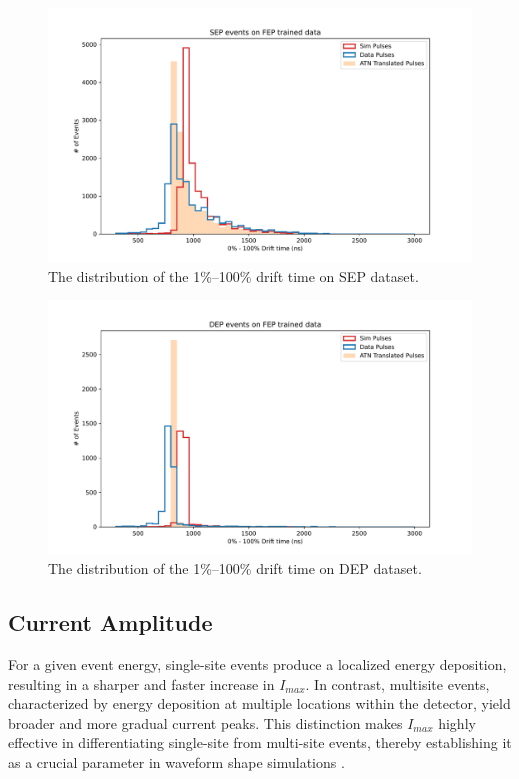 \begin{figure}%
\centering
\includegraphics[width=0.9\linewidth,trim={0pc 0pc 0pc 0pc},clip]{ch8/figs/sep_drift_time.pdf}
\caption{The distribution of the 1\%–100\% drift time on SEP dataset.}
\label{fig:drift_times_sep}
\end{figure}

\begin{figure}%
\centering
\includegraphics[width=0.9\linewidth,trim={0pc 0pc 0pc 0pc},clip]{ch8/figs/dep_drift_time.pdf}
\caption{The distribution of the 1\%–100\% drift time on DEP dataset.}
\label{fig:drift_times_dep}
\end{figure}

\subsection{Current Amplitude}

For a given event energy, single-site events produce a localized energy deposition, resulting in a sharper and faster increase in $I_{max}$. In contrast, multisite events, characterized by energy deposition at multiple locations within the detector, yield broader and more gradual current peaks. This distinction makes $I_{max}$ highly effective in differentiating single-site from multi-site events, thereby establishing it as a crucial parameter in waveform shape simulations \cite{mjd_psd}.

